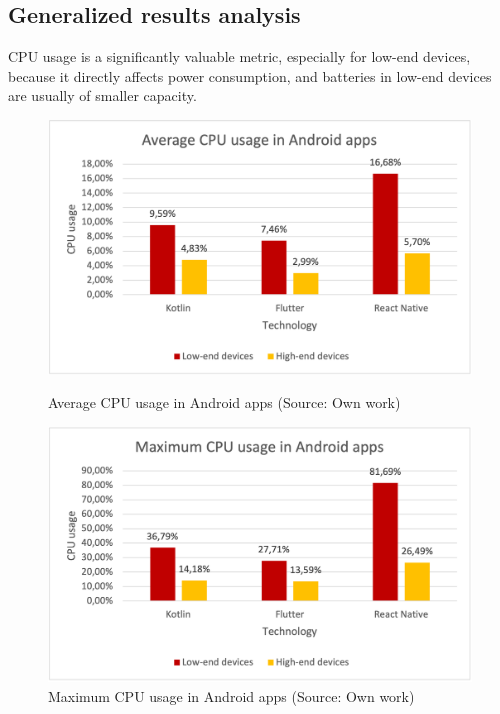 
\subsection{Generalized results analysis}

CPU usage is a significantly valuable metric, especially for low-end devices, because it directly affects power consumption, and batteries in low-end devices are usually of smaller capacity.

\begin{figure}[H]
    \begin{minipage}{.48\textwidth}
        \includegraphics[width=\textwidth]{img/cpu_average_android}
        \caption{Average CPU usage in Android apps (Source: Own work)}
        \label{fig:cpu_avg_android}
    \end{minipage}
    \hfill
    \begin{minipage}{.48\textwidth}
        \includegraphics[width=\textwidth]{img/cpu_max_android}
        \caption{Maximum CPU usage in Android apps (Source: Own work)}
        \label{fig:cpu_max_android}
    \end{minipage}
\end{figure}

